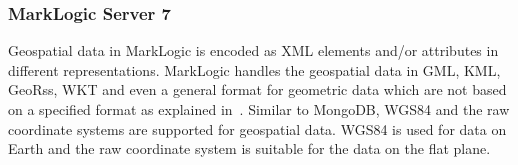 \documentclass[a4paper,12pt]{article}
\begin{document}

\subsubsection{MarkLogic Server 7}
Geospatial data in MarkLogic is encoded as XML elements and/or attributes in different representations. MarkLogic handles the geospatial data in GML, KML, GeoRss, WKT and even a general format for geometric data which are not based on a specified format as explained in~\cite{marklogicGeo}. Similar to MongoDB, WGS84 and the raw coordinate systems are supported for geospatial data. WGS84 is used for data on Earth and the raw coordinate system is suitable for the data on the flat plane.
\end{document}
